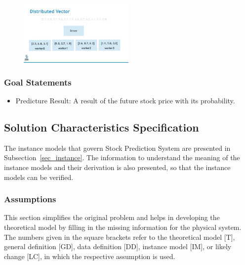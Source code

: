 \documentclass[12pt]{article}
\newcounter{goalnum} %
\newcommand{\progname}{Stock Prediction System} %
\begin{document}
\begin{figure}[h!]
\begin{center}
{
  \includegraphics[width=0.5\textwidth]{sparkrdd.png}
 }
 \caption{\label{Spark}}
 \end{center}
 \end{figure}

\subsubsection{Goal Statements}

\begin{itemize}

\item Predicture Result\thegoalnum \label{G_meaningfulLabel}: A result of the future stock price with its probability.

\end{itemize}

\subsection{Solution Characteristics Specification}

The instance models that govern \progname{} are presented in
Subsection~\ref{sec_instance}.  The information to understand the meaning of the
instance models and their derivation is also presented, so that the instance
models can be verified.

\subsubsection{Assumptions}

This section simplifies the original problem and helps in developing the
theoretical model by filling in the missing information for the physical
system. The numbers given in the square brackets refer to the theoretical model
[T], general definition [GD], data definition [DD], instance model [IM], or
likely change [LC], in which the respective assumption is used.
\end{document}
